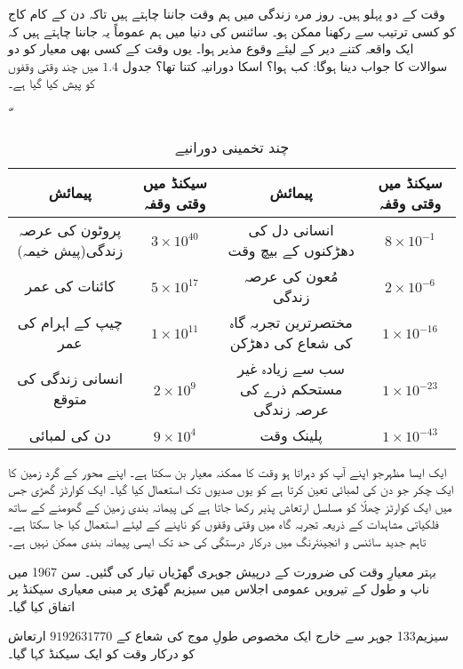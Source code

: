 	

	وقت کے دو پہلو ہیں۔ روز مرہ زندگی میں ہم وقت جاننا چاہتے ہیں تاکہ دن کے کام کاج کو کسی ترتیب سے رکھنا ممکن ہو۔ سائنس کی دنیا میں ہم عموماً یہ جاننا چاہتے ہیں کہ ایک واقعہ کتنے دیر کے لیئے وقوع مذیر ہوا۔ یوں وقت کے کسی بھی معیار کو دو سوالات کا جواب دینا ہوگا: کب ہوا؟ اسکا دورانیہ کتنا تھا؟ جدول $\num{1.4}$ میں چند وقتی وقفوں کو پیش کیا گیا ہے۔
	
	\begin{table}[h!]
		\caption{چند تخمینی دورانیے}
	\label{جدول_پیمائش_تخمینی_دورانیے}ّ
		\centering
		\begin{tabular}{|c c|c c|}
			\hline
			پیمائش & سیکنڈ میں وقتی وقفہ & پیمائش & سیکنڈ میں وقتی وقفہ\\
			\hline\hline
			پروٹون کی عرصہ زندگی(پیش خیمہ) & $3\times 10^{40}$ & انسانی دل کی دھڑکنوں کے بیچ وقت & $8\times 10^{-1}$\\
			\hline
			کائنات کی عمر & $5\times 10^{17}$ & مُعون کی عرصہ زندگی & $2\times 10^{-6}$\\
			\hline
			چیپ کے اہرام کی عمر & $1\times 10^{11}$ & مختصرترین تجربہ گاہ کی شعاع کی دھڑکن & $1\times 10^{-16}$\\
			\hline
			انسانی زندگی کی متوقع & $2\times 10^{9}$ & سب سے زیادہ غیر مستحکم ذرے کی عرصہ زندگی & $1\times 10^{-23}$\\
			\hline
			دن کی لمبائی & $9\times 10^{4}$ & پلینک وقت & $1\times 10^{-43}$\\
			\hline
		\end{tabular}
	\end{table}
ایک ایسا مظہرجو اپنے آپ کو دہراتا ہو وقت کا ممکنہ معیار بن سکتا ہے۔ اپنے محور کے گرد زمین کا ایک چکر جو دن کی لمبائی تعین کرتا ہے کو یوں صدیوں تک استعمال کیا گیا۔ ایک کوارٹز گھڑی جس میں ایک کوارٹز چھلّا کو مسلسل ارتعاش پذیر رکھا جاتا ہے کی پیمانہ بندی زمین کے گھومنے کے ساتھ فلکیاتی مشاہدات کے ذریعہ تجربہ گاہ میں وقتی وقفوں کو ناپنے کے لیئے استعمال کیا جا سکتا ہے۔ تاہم جدید سائنس و انجینئرنگ میں درکار درستگی کی حد تک ایسی پیمانہ بندی ممکن نہیں ہے۔

بہتر معیارِ وقت کی ضرورت کے درپیش جوہری گھڑیاں تیار کی گئیں۔ سن 1967 میں ناپ و طول کے تیرویں عمومی اجلاس میں سیزیم گھڑی پر مبنی معیاری سیکنڈ پر اتفاق کیا گیا۔

سیزیم133 جوہر سے خارج ایک مخصوص طولِ موج کی شعاع کے $\num{9192631770}$ ارتعاش کو درکار وقت کو ایک سیکنڈ کہا گیا۔

